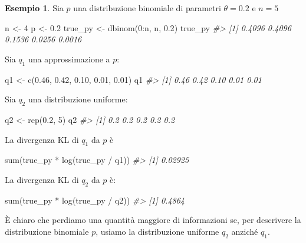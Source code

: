 \documentclass[
  11pt,
]{krantz}
\makeatletter
\newenvironment{Shaded}{\begin{snugshade}}{\end{snugshade}}
\newcommand{\CommentTok}[1]{\textcolor[rgb]{0.37,0.37,0.37}{\textit{#1}}}
\newcommand{\DecValTok}[1]{\textcolor[rgb]{0.06,0.06,0.06}{#1}}
\newcommand{\FloatTok}[1]{\textcolor[rgb]{0.06,0.06,0.06}{#1}}
\newcommand{\FunctionTok}[1]{\textcolor[rgb]{0,0,0}{#1}}
\newcommand{\NormalTok}[1]{#1}
\newcommand{\OtherTok}[1]{\textcolor[rgb]{0.37,0.37,0.37}{#1}}
\newcommand{\SpecialCharTok}[1]{\textcolor[rgb]{0,0,0}{#1}}
\newenvironment{kframe}{%
\medskip{}
\setlength{\fboxsep}{.8em}
 \def\at@end@of@kframe{}%
 \ifinner\ifhmode%
  \def\at@end@of@kframe{\end{minipage}}%
  \begin{minipage}{\columnwidth}%
 \fi\fi%
 \def\FrameCommand##1{\hskip\@totalleftmargin \hskip-\fboxsep
 \colorbox{shadecolor}{##1}\hskip-\fboxsep
     \hskip-\linewidth \hskip-\@totalleftmargin \hskip\columnwidth}%
 \MakeFramed {\advance\hsize-\width
   \@totalleftmargin\z@ \linewidth\hsize
   \@setminipage}}%
 {\par\unskip\endMakeFramed%
 \at@end@of@kframe}
\renewenvironment{Shaded}{\begin{kframe}}{\end{kframe}}
\theoremstyle{definition}
\theoremstyle{definition}
\newtheorem{example}{Esempio}[chapter]
\theoremstyle{definition}
\theoremstyle{definition}
\theoremstyle{remark}
\makeatother
\begin{document}
\begin{example}
Sia \(p\) una distribuzione binomiale di parametri \(\theta = 0.2\) e \(n = 5\)

\begin{Shaded}
\begin{Highlighting}[]
\NormalTok{n }\OtherTok{\textless{}{-}} \DecValTok{4}
\NormalTok{p }\OtherTok{\textless{}{-}} \FloatTok{0.2}
\NormalTok{true\_py }\OtherTok{\textless{}{-}} \FunctionTok{dbinom}\NormalTok{(}\DecValTok{0}\SpecialCharTok{:}\NormalTok{n, n, }\FloatTok{0.2}\NormalTok{)}
\NormalTok{true\_py}
\CommentTok{\#\textgreater{} [1] 0.4096 0.4096 0.1536 0.0256 0.0016}
\end{Highlighting}
\end{Shaded}

\noindent Sia \(q_1\) una approssimazione a \(p\):

\begin{Shaded}
\begin{Highlighting}[]
\NormalTok{q1 }\OtherTok{\textless{}{-}} \FunctionTok{c}\NormalTok{(}\FloatTok{0.46}\NormalTok{, }\FloatTok{0.42}\NormalTok{, }\FloatTok{0.10}\NormalTok{, }\FloatTok{0.01}\NormalTok{, }\FloatTok{0.01}\NormalTok{)}
\NormalTok{q1}
\CommentTok{\#\textgreater{} [1] 0.46 0.42 0.10 0.01 0.01}
\end{Highlighting}
\end{Shaded}

Sia \(q_2\) una distribuzione uniforme:

\begin{Shaded}
\begin{Highlighting}[]
\NormalTok{q2 }\OtherTok{\textless{}{-}} \FunctionTok{rep}\NormalTok{(}\FloatTok{0.2}\NormalTok{, }\DecValTok{5}\NormalTok{)}
\NormalTok{q2}
\CommentTok{\#\textgreater{} [1] 0.2 0.2 0.2 0.2 0.2}
\end{Highlighting}
\end{Shaded}

La divergenza KL di \(q_1\) da \(p\) è

\begin{Shaded}
\begin{Highlighting}[]
\FunctionTok{sum}\NormalTok{(true\_py }\SpecialCharTok{*} \FunctionTok{log}\NormalTok{(true\_py }\SpecialCharTok{/}\NormalTok{ q1))}
\CommentTok{\#\textgreater{} [1] 0.02925}
\end{Highlighting}
\end{Shaded}

La divergenza KL di \(q_2\) da \(p\) è:

\begin{Shaded}
\begin{Highlighting}[]
\FunctionTok{sum}\NormalTok{(true\_py }\SpecialCharTok{*} \FunctionTok{log}\NormalTok{(true\_py }\SpecialCharTok{/}\NormalTok{ q2))}
\CommentTok{\#\textgreater{} [1] 0.4864}
\end{Highlighting}
\end{Shaded}

È chiaro che perdiamo una quantità maggiore di informazioni se, per descrivere la distribuzione binomiale \(p\), usiamo la distribuzione uniforme \(q_2\) anziché \(q_1\).
\end{example}
\end{document}
